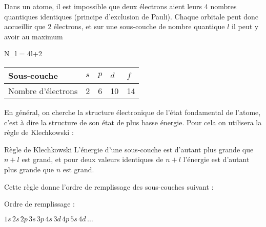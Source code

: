 \documentclass{cours}
\begin{document}
Dans un atome, il est impossible que deux électrons aient leurs 4 nombres quantiques identiques (principe d'exclusion de Pauli). Chaque orbitale peut donc accueillir que 2 électrons, et sur une sous-couche de nombre quantique $l$ il peut y avoir au maximum 
\begin{eqencadre}
  N_l = 4l+2 \quad {}
\end{eqencadre}

\begin{center}
  \begin{tabular}{@{}lllll@{}}
    \toprule
    Sous-couche & $s$ & $p$ & $d$ & $f$  \\
    \midrule
    Nombre d'électrons & 2 & 6 & 10 & 14 \\
    \bottomrule
  \end{tabular}
\end{center} 

En général, on cherche la structure électronique de l'état fondamental de l'atome, c'est à dire la structure de son état de plus basse énergie. Pour cela on utilisera la règle de Klechkowski :

\begin{loi}{Règle de Klechkowski}
  L'énergie d'une sous-couche est d'autant plus grande que $n+l$ est grand, et pour deux valeurs identiques de $n+l$ l'énergie est d'autant plus grande que $n$ est grand.

  Cette règle donne l'ordre de remplissage des sous-couches suivant :
  
  \begin{minipage}{0.5\linewidth}
  \begin{center}
    \def\lookup#1{\directlua {
    local array={"s","p","d","f"}; tex.print(array[#1])}}
    
  \end{center}
\end{minipage}%
  \begin{minipage}{0.5\linewidth}
    Ordre de remplissage :

    $1s\,2s\,2p\,3s\,3p\,4s\,3d\,4p\, 5s\, 4d\,  \ldots$ 
\end{minipage}%
\end{loi}
\end{document}
